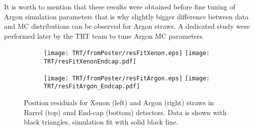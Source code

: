 It is worth to mention that these results were obtained before fine tuning of Argon simulation parameters that is why slightly bigger difference between 
data and MC distributions can be observed for Argon straws. A dedicated study were performed later by the TRT team to tune Argon MC parameters.

\begin{figure}

\begin{subfigure}{.5\textwidth}
  \centering
  \texttt{[image: TRT/fromPoster/resFitXenon.eps]}
  \texttt{[image: TRT/resFitXenonEndcap.pdf]}
\end{subfigure}%
\begin{subfigure}{.5\textwidth}
  \centering
  \texttt{[image: TRT/fromPoster/resFitArgon.eps]}
  \texttt{[image: TRT/resFitArgon\_Endcap.pdf]}
\end{subfigure}

\caption{Position residuals for Xenon (left) and Argon (right) straws in Barrel (top) amd End-cap (bottom) detectors. Data is shown with black triangles, 
simulation fit with solid black line.}
  \label{fig:resFit}
\end{figure}


